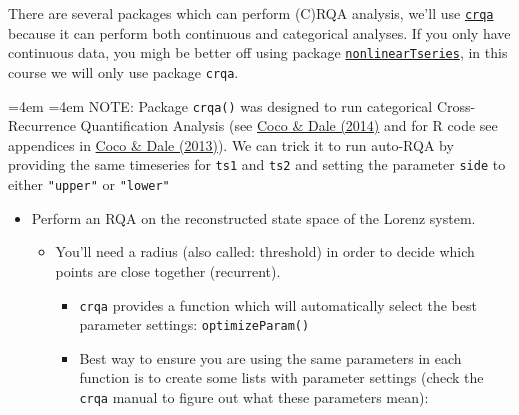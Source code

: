 \documentclass[]{book}
\providecommand{\tightlist}{%
  \setlength{\itemsep}{0pt}\setlength{\parskip}{0pt}}
\renewenvironment{quote}{%
  \par \small \medskip \block
  \leftskip=4em \rightskip=4em%
  \noindent \ignorespaces}{%
  \par \medskip
  }
\begin{document}
There are several packages which can perform (C)RQA analysis, we'll use
\href{https://cran.r-project.org/web/packages/crqa/index.html}{\texttt{crqa}}
because it can perform both continuous and categorical analyses. If you
only have continuous data, you migh be better off using package
\href{https://cran.r-project.org/web/packages/nonlinearTseries/index.html}{\texttt{nonlinearTseries}},
in this course we will only use package \texttt{crqa}.

\begin{quote}
NOTE: Package \texttt{crqa()} was designed to run categorical
Cross-Recurrence Quantification Analysis (see
\href{http://journal.frontiersin.org/Journal/10.3389/fpsyg.2014.00510/abstract}{Coco
\& Dale (2014)} and for R code see appendices in
\href{http://arxiv.org/abs/1310.0201}{Coco \& Dale (2013)}). We can
trick it to run auto-RQA by providing the same timeseries for
\texttt{ts1} and \texttt{ts2} and setting the parameter \texttt{side} to
either \texttt{"upper"} or \texttt{"lower"}
\end{quote}

\begin{itemize}
\tightlist
\item
  Perform an RQA on the reconstructed state space of the Lorenz system.

  \begin{itemize}
  \tightlist
  \item
    You'll need a radius (also called: threshold) in order to decide
    which points are close together (recurrent).

    \begin{itemize}
    \tightlist
    \item
      \texttt{crqa} provides a function which will automatically select
      the best parameter settings: \texttt{optimizeParam()}
    \item
      Best way to ensure you are using the same parameters in each
      function is to create some lists with parameter settings (check
      the \texttt{crqa} manual to figure out what these parameters
      mean):
    \end{itemize}
  \end{itemize}
\end{itemize}
\end{document}
